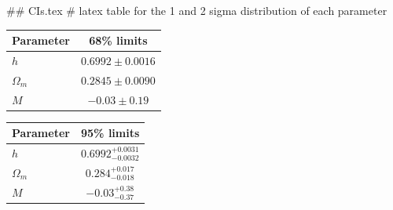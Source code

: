 ## CIs.tex
# latex table for the 1 and 2 sigma distribution of each parameter

\begin{tabular} { l  c}
 Parameter &  68\% limits\\
\hline
{\boldmath$h              $} & $0.6992\pm 0.0016          $\\
{\boldmath$\Omega_m       $} & $0.2845\pm 0.0090          $\\
{\boldmath$M              $} & $-0.03\pm 0.19             $\\
\hline
\end{tabular}

\begin{tabular} { l  c}
 Parameter &  95\% limits\\
\hline
{\boldmath$h              $} & $0.6992^{+0.0031}_{-0.0032}$\\
{\boldmath$\Omega_m       $} & $0.284^{+0.017}_{-0.018}   $\\
{\boldmath$M              $} & $-0.03^{+0.38}_{-0.37}     $\\
\hline
\end{tabular}
